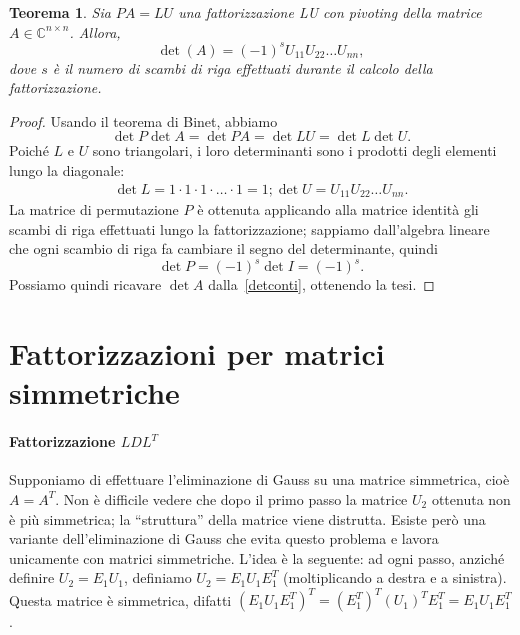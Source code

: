 \documentclass[a4paper]{report}
\newtheorem{theorem}{Teorema}[chapter]
\theoremstyle{definiton}
\theoremstyle{remark}
\begin{document}
\begin{theorem}
Sia $PA = LU$ una fattorizzazione LU con pivoting della matrice $A \in \mathbb{C}^{n \times n}$. Allora,
\[
\det(A) = (-1)^s U_{11} U_{22} \dots U_{nn},
\]
dove $s$ è il numero di scambi di riga effettuati durante il calcolo della fattorizzazione.
\end{theorem}
\begin{proof}
Usando il teorema di Binet, abbiamo
\begin{equation} \label{detconti}
    \det P \det A = \det PA = \det LU = \det L \det U.    
\end{equation}
Poiché $L$ e $U$ sono triangolari, i loro determinanti sono i prodotti degli elementi lungo la diagonale:
\begin{align*}
\det L = 1 \cdot 1 \cdot 1 \cdot \dots \cdot 1 = 1;
\det U = U_{11} U_{22} \dots U_{nn}.
\end{align*}
La matrice di permutazione $P$ è ottenuta applicando alla matrice identità gli scambi di riga effettuati lungo la fattorizzazione; sappiamo dall'algebra lineare che ogni scambio di riga fa cambiare il segno del determinante, quindi
\[
\det P = (-1)^s \det I = (-1)^s.
\]
Possiamo quindi ricavare $\det A$ dalla~\eqref{detconti}, ottenendo la tesi.
\end{proof}


\section{Fattorizzazioni per matrici simmetriche}

\paragraph{Fattorizzazione $LDL^T$}

Supponiamo di effettuare l'eliminazione di Gauss su una matrice simmetrica, cioè $A = A^T$. Non è difficile vedere che dopo il primo passo la matrice $U_2$ ottenuta non è più simmetrica; la ``struttura'' della matrice viene distrutta. Esiste però una variante dell'eliminazione di Gauss che evita questo problema e lavora unicamente con matrici simmetriche. L'idea è la seguente: ad ogni passo, anziché definire $U_{2} = E_1 U_1$, definiamo $U_{2} = E_1 U_1 E_1^T$ (moltiplicando a destra e a sinistra). Questa matrice è simmetrica, difatti $(E_1 U_1 E_1^T)^T = (E_1^T)^T (U_1)^T E_1^T = E_1 U_1 E_1^T$.
\end{document}
